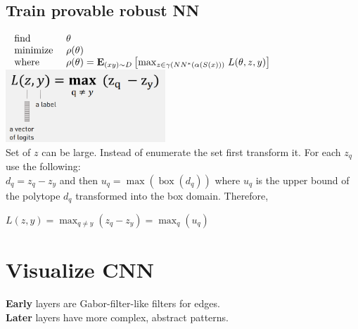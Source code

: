 \documentclass[11pt]{extarticle}
\begin{document}
\begin{multicols*}{3}
		\subsection{Train provable robust NN}
		$\begin{array} { l l }
		{ \text { find } } & { \theta } \\ { \text { minimize } } & { \rho ( \theta ) } \\ { \text { where } } & { \rho ( \theta ) = \mathbf { E } _ { ( x y ) \sim D } \left[ \max _ { z \in \gamma \left( N N ^ { * } ( \alpha ( S ( x ) ) ) \right. } L ( \theta , z , y ) \right] }
		\end{array}$\\
		\includegraphics[width=6cm]{Loss_abstract.png}\\
		Set of $z$ can be large. Instead of enumerate the set first transform it. For each $z_q$ use the following: \\
		$d_q = z_q - z_y$ and then $u_q = \max \left( \operatorname { box } \left( d _ { q } \right) \right)$
		where $u_q$ is the upper bound of the polytope $d_q$ transformed into the box domain. Therefore,
		
		$L ( z , y ) = \max _ { q \neq y } \left( z _ { q } - z _ { y } \right) = \max _ { q} (u_q )$
		
		\section{Visualize CNN}
		    \textbf{Early} layers are Gabor-filter-like filters for edges.\\
		    \textbf{Later} layers have more complex, abstract patterns.\\

\end{multicols*}
\end{document}
